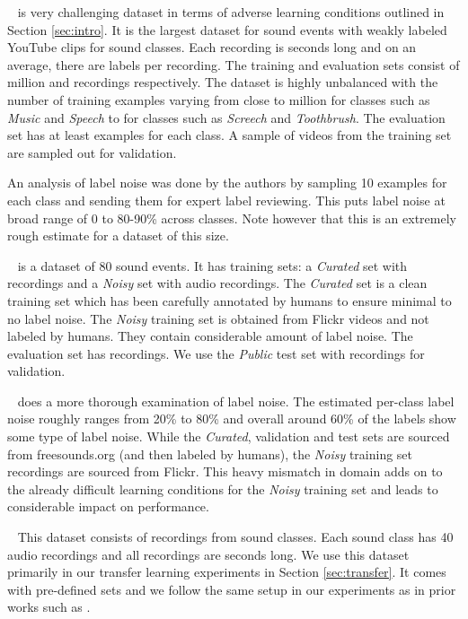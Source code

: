 \documentclass{article}
\begin{document}
~\cite{gemmeke2017audio} \label{sec:audioset} is very challenging dataset in terms of adverse learning conditions outlined in Section \ref{sec:intro}. It is the largest dataset for sound events with weakly labeled YouTube clips for  sound classes. 
Each recording is  seconds long and on an average, there are  labels per recording. 
The training and evaluation sets consist of  million and  recordings respectively. 
The dataset is highly unbalanced with  the number of training examples varying from close to  million for classes such as \emph{Music} and \emph{Speech} to  for classes such as \emph{Screech} and \emph{Toothbrush}. 
The evaluation set has at least  examples for each class. 
A sample of  videos from the training set are sampled out for validation. 

An analysis of label noise was done by the authors by sampling 10 examples for each class and sending them for expert label reviewing. This puts label noise at broad range of 0 to 80-90\%  across classes. Note however that this is an extremely rough estimate for a dataset of this size. 

\label{sec:fsdkaggle} ~\cite{fonseca2019audio} is a dataset of 80 sound events. It has  training sets: a \emph{Curated} set with  recordings and a \emph{Noisy} set with  audio recordings. 
The \emph{Curated} set is a clean training set which has been carefully annotated by humans to ensure minimal to no label noise. 
The \emph{Noisy} training set is obtained from Flickr videos and not labeled by humans. They contain considerable amount of label noise. The evaluation set has  recordings. 
We use the \emph{Public} test set with  recordings for validation. 

~\cite{fonseca2019audio} does a more thorough examination of label noise. The estimated per-class label noise roughly ranges from 20\% to 80\% and overall around  60\% of the labels show some type of label noise. While the \emph{Curated}, validation and test sets are sourced from freesounds.org (and then labeled by humans), 
the \emph{Noisy} training set recordings are sourced from Flickr. This heavy mismatch in domain adds on to the already difficult learning conditions for the \emph{Noisy} training set and leads to considerable impact on performance.  

~\cite{piczak2015esc} \label{sec:esc50}
This dataset consists of  recordings from  sound classes. 
Each sound class has 40 audio recordings and all recordings are  seconds long. 
We use this dataset primarily in our transfer learning experiments in Section \ref{sec:transfer}. 
It comes with  pre-defined sets and we follow the same setup in our experiments as in prior works such as \cite{kumar2017knowledge}. 
\end{document}
